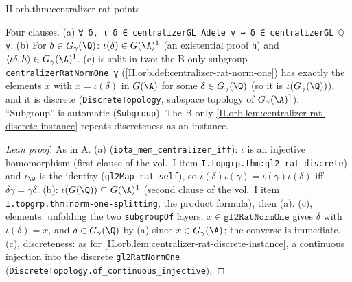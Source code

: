 \begin{theorem}
\end{theorem}
\begin{tfformal}{II.orb.thm:centralizer-rat-points}
\begin{tffidelity}
Four clauses. (a) \texttt{∀ δ, ι δ ∈ centralizerGL Adele γ ↔ δ ∈ centralizerGL ℚ γ}. (b) For $\delta\in G_\gamma(\Q)$: $\iota(\delta)\in G(\A)^1$ (an existential proof \texttt{h}) and $\langle\iota\delta,h\rangle\in G_\gamma(\A)^1$. (c) is split in two: the B-only subgroup \texttt{centralizerRatNormOne γ} (\cref{II.orb.def:centralizer-rat-norm-one}) has exactly the elements $x$ with $x=\iota(\delta)$ in $G(\A)$ for some $\delta\in G_\gamma(\Q)$ (so it is $\iota(G_\gamma(\Q))$), and it is discrete (\texttt{DiscreteTopology}, subspace topology of $G_\gamma(\A)^1$). ``Subgroup'' is automatic (\texttt{Subgroup}). The B-only \cref{II.orb.lem:centralizer-rat-discrete-instance} repeats discreteness as an instance.
\end{tffidelity}
\end{tfformal}
\begin{proof}[Lean proof]
As in A. (a) (\texttt{iota\_mem\_centralizer\_iff}): $\iota$ is an injective homomorphism (first clause of the vol.~I item \texttt{I.topgrp.thm:gl2-rat-discrete}) and $\iota_\Q$ is the identity (\texttt{gl2Map\_rat\_self}), so $\iota(\delta)\iota(\gamma)=\iota(\gamma)\iota(\delta)$ iff $\delta\gamma=\gamma\delta$. (b): $\iota(G(\Q))\subseteq G(\A)^1$ (second clause of the vol.~I item \texttt{I.topgrp.thm:norm-one-splitting}, the product formula), then (a). (c), elements: unfolding the two \texttt{subgroupOf} layers, $x\in\texttt{gl2RatNormOne}$ gives $\delta$ with $\iota(\delta)=x$, and $\delta\in G_\gamma(\Q)$ by (a) since $x\in G_\gamma(\A)$; the converse is immediate. (c), discreteness: as for \cref{II.orb.lem:centralizer-rat-discrete-instance}, a continuous injection into the discrete \texttt{gl2RatNormOne} (\texttt{DiscreteTopology.of\_continuous\_injective}).
\end{proof}

